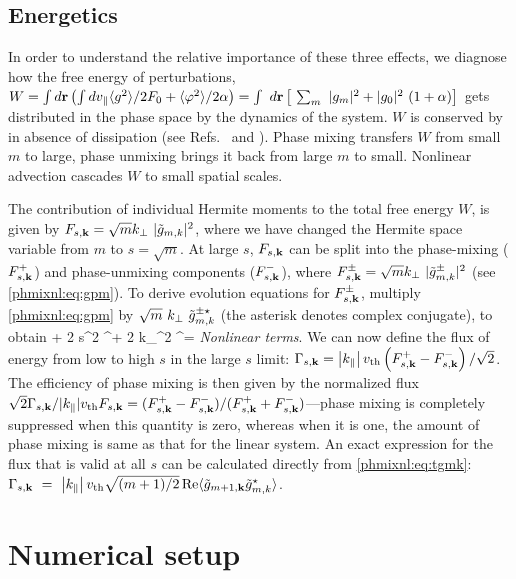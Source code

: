 \subsection{Energetics}
\label{phmixnl:sec:energetics}

In order to understand the relative importance of these three effects, we diagnose how the
free energy of perturbations, $W = \int d
\mathbf{r} \left(\int d v_\parallel \langle g^2 \rangle/2 F_0 + \langle \varphi^2 \rangle/2 \alpha
\right)=\int~d\mathbf{r}\left[~\sum_m~|g_m|^2+|g_0|^2~(1+\alpha)\right]$ gets distributed in the phase
space by the dynamics of the system. $W$ is conserved by 
in absence of dissipation (see Refs.~\cite{schekochihin08, tome, kanekar14a} and
).
Phase mixing transfers $W$ from small $m$ to large, phase unmixing brings it back from
large
$m$ to small. Nonlinear advection cascades $W$ to small spatial scales. 

The contribution of individual Hermite moments to the total free energy $W$, 
is given by
$F_{s,\mathbf{k}}=\sqrt{m}k_\perp~|\tilde g_{m,k}|^2$, where we have changed the Hermite space variable
from $m$ to $s=\sqrt{m}$. At large $s$, $F_{s,\mathbf{k}}$ can be split into the phase-mixing ($F_{s,\mathbf{k}}^+$) and
phase-unmixing components ($F_{s,\mathbf{k}}^-$), where $F_{s,\mathbf{k}}^\pm=\sqrt{m}k_\perp~|\tilde g_{m,k}^\pm|^2$ (see
\eqref{phmixnl:eq:gpm}).
To derive evolution equations for
$F_{s,\mathbf{k}}^\pm$, multiply \eqref{phmixnl:eq:gpm} by
$\sqrt{m}~k_\perp~\tilde g_{m,k}^{\pm \star}$ (the asterisk denotes complex conjugate), to
obtain
\bea
     \pm {}  + 2 \nu
    s^2 \Fsk^\pm + 2 \eta k_\perp^2 \Fsk^\pm =  
    \textit{Nonlinear terms}.
    \label{phmixnl:eq:Fskpm}
\eea
We can now define the flux of energy from low to high $s$ in the large $s$ limit: 
$\Gamma_{s,\mathbf{k}} = \left|k_\parallel\right| v_{\rm th} \left(F_{s,\mathbf{k}}^+-F_{s,\mathbf{k}}^-\right)/\sqrt{2}$. The efficiency of phase mixing is then given by the
normalized flux $\sqrt{2}\Gamma_{s,\mathbf{k}}/
|k_\parallel|v_{\rm th}F_{s,\mathbf{k}} = (F_{s,\mathbf{k}}^+ - F_{s,\mathbf{k}}^-)/(F_{s,\mathbf{k}}^+ + F_{s,\mathbf{k}}^-)$---phase mixing is completely suppressed when this quantity
is zero, whereas when it is one, the amount of phase mixing is same as that for the linear
system. 
An exact expression for the
flux that is valid at all $s$  can be calculated directly from 
\eqref{phmixnl:eq:tgmk}: $\Gamma_{s,\mathbf{k}}~=~\left|k_\parallel\right| v_{\rm th} \sqrt{(m+1)/2} \, {\rm Re} \langle
\tilde g_{m+1,\mathbf{k}} \tilde g_{m,k}^\star \rangle$. %

\section{Numerical setup}
    
